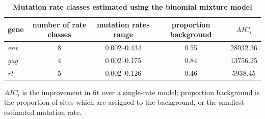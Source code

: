 \documentclass[10pt]{article}
\begin{document}
\begin{table}[!ht]
\caption{
\bf{Mutation rate classes estimated using the binomial mixture model}}
\begin{tabular}{lcccc}
gene & number of rate classes & mutation rates range & proportion background & $AIC_{i}$ \\
\hline
\textit{env} & 8 & 0.002--0.434 & 0.55 & 28032.36 \\
\textit{gag} & 4 & 0.002--0.175 & 0.84 & 13756.25 \\
\textit{rt}  & 5 & 0.002--0.126 & 0.46 &  5938.45 \\
\end{tabular}
\begin{flushleft}
$AIC_{i}$ is the improvement in fit over a single-rate model;
proportion background is the proportion of sites
which are assigned to the background,
or the smallest estimated mutation rate.
\end{flushleft}
\label{table:rateclasses}
\end{table}
\end{document}
